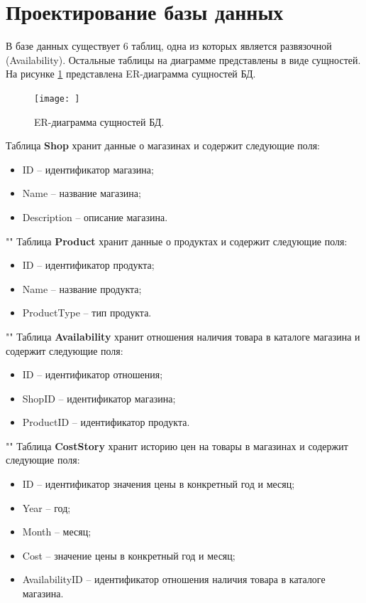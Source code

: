 \documentclass[a4paper,14pt]{extreport}
\begin{document}
\section{Проектирование базы данных}

В базе данных существует 6 таблиц, одна из которых является развязочной (Availability). Остальные таблицы на диаграмме представлены в виде сущностей. На рисунке \ref{db} представлена ER-диаграмма сущностей БД.

\begin{figure}[H]
	\centering
	\texttt{[image: ]}
	\caption{ER-диаграмма сущностей БД.}
	\label{db}
\end{figure}

Таблица \textbf{Shop} хранит данные о магазинах и содержит следующие поля:
\begin{itemize}
	\setlength\itemsep{0.01em}
	\item ID -- идентификатор магазина;
	\item Name -- название магазина;
	\item Description -- описание магазина.
\end{itemize}

""\newline\indent
Таблица \textbf{Product} хранит данные о продуктах и содержит следующие поля:
\begin{itemize}
	\setlength\itemsep{0.01em}
	\item ID -- идентификатор продукта;
	\item Name -- название продукта;
	\item ProductType -- тип продукта.
\end{itemize}

""\newline\indent
Таблица \textbf{Availability} хранит отношения наличия товара в каталоге магазина и содержит следующие поля:
\begin{itemize}
	\setlength\itemsep{0.01em}
	\item ID -- идентификатор отношения;
	\item ShopID -- идентификатор магазина;
	\item ProductID -- идентификатор продукта.
\end{itemize}

""\newline\indent
Таблица \textbf{CostStory} хранит историю цен на товары в магазинах и содержит следующие поля:
\begin{itemize}
	\setlength\itemsep{0.01em}
	\item ID -- идентификатор значения цены в конкретный год и месяц;
	\item Year -- год;
	\item Month -- месяц;
	\item Cost -- значение цены в конкретный год и месяц;
	\item AvailabilityID -- идентификатор отношения наличия товара в каталоге магазина.
\end{itemize}
\end{document}
